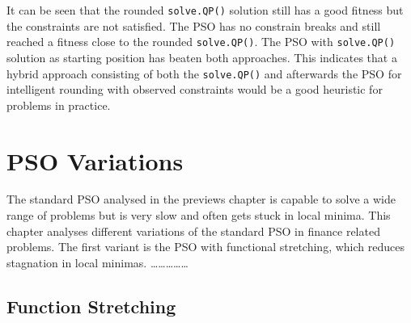 \documentclass[
  oneside]{book}
\begin{document}
It can be seen that the rounded \texttt{solve.QP()} solution still has a good fitness but the constraints are not satisfied. The PSO has no constrain breaks and still reached a fitness close to the rounded \texttt{solve.QP()}. The PSO with \texttt{solve.QP()} solution as starting position has beaten both approaches. This indicates that a hybrid approach consisting of both the \texttt{solve.QP()} and afterwards the PSO for intelligent rounding with observed constraints would be a good heuristic for problems in practice.

\hypertarget{pso-variations}{%
\chapter{PSO Variations}\label{pso-variations}}

The standard PSO analysed in the previews chapter is capable to solve a wide range of problems but is very slow and often gets stuck in local minima. This chapter analyses different variations of the standard PSO in finance related problems. The first variant is the PSO with functional stretching, which reduces stagnation in local minimas. \ldots\ldots\ldots\ldots\ldots{}

\hypertarget{function-stretching}{%
\section{Function Stretching}\label{function-stretching}}
\end{document}
